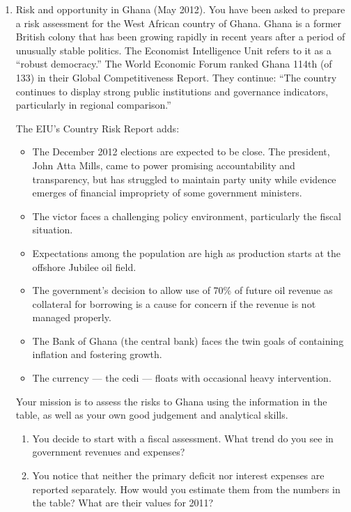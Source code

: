 \setlength{\leftmargini}{.5\oldleftmargini}
\begin{enumerate}
\item Risk and opportunity in Ghana (May 2012).
You have been asked to prepare a risk assessment for
the West African country of Ghana.
Ghana is a former British colony that has been growing rapidly
in recent years after a period of unusually stable politics.
The Economist Intelligence Unit refers to it as a ``robust democracy.''
The World Economic Forum ranked Ghana 114th (of 133)
in their Global Competitiveness Report.
They continue:
``The country continues to display strong public institutions and
governance indicators,
particularly in regional comparison.''

The EIU's Country Risk Report adds:
\begin{itemize}
\item The December 2012 elections are expected to be close.
The president, John Atta Mills, came to power promising accountability
and transparency, but  has struggled to maintain party unity
while evidence emerges of financial impropriety of some government ministers.
\item The victor faces a challenging policy environment, particularly
the fiscal situation.
\item Expectations among the population are high as production
starts at the offshore Jubilee oil field.
\item The government's decision to allow use of 70\% of future
oil revenue as collateral for borrowing is a cause for concern
if the revenue is not managed properly.
\item The Bank of Ghana (the central bank) faces the twin goals of
containing inflation and fostering growth.
\item The currency  ---  the cedi --- floats with occasional heavy intervention.
\end{itemize}
%
Your mission is to assess the risks to Ghana  using
the information in the table, as well as
your own good judgement and analytical skills.

\begin{enumerate}
\item  You decide to start with a fiscal assessment.
What trend do you see in government revenues and expenses?

\item You notice that neither the primary deficit nor
interest expenses are reported separately.
How would you estimate them from the numbers in the table?
What are their values for 2011?


\end{enumerate}
\end{enumerate}
